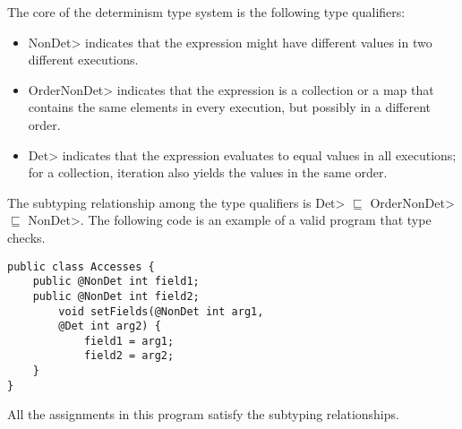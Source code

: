 The core of the determinism type system
is the following type qualifiers:
\begin{itemize}
    \item \<NonDet> indicates
    that the expression might have different values in two different executions.
    \item \<OrderNonDet> indicates that the expression is a collection or
    a map that contains the same elements in every execution, but possibly
    in a different order.
    \item \<Det> indicates that the expression evaluates to equal values in
    all executions; for a collection, iteration
    also yields the values in the same order.
\end{itemize}
The subtyping relationship among the type qualifiers is \<Det> $\sqsubseteq$ \<OrderNonDet> $\sqsubseteq$ \<NonDet>.
The following code is an example of a valid program that type checks. 
\begin{Verbatim}
public class Accesses {
    public @NonDet int field1;
    public @NonDet int field2;
        void setFields(@NonDet int arg1, 
        @Det int arg2) {
            field1 = arg1;
            field2 = arg2;
    }
}
\end{Verbatim}
All the assignments in this program 
satisfy the subtyping relationships.
 
